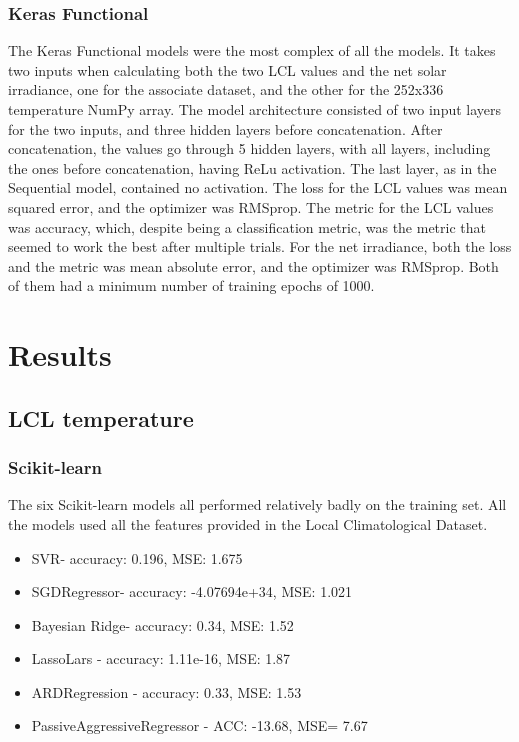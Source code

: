 \documentclass[conference]{IEEEtran}
\begin{document}
\subsubsection{Keras Functional}
The Keras Functional models were the most complex of all the models. It takes two inputs when calculating both the two LCL values and the net solar irradiance, one for the associate dataset, and the other for the 252x336 temperature NumPy array. The model
architecture consisted of two input layers for the two inputs, and three hidden layers before concatenation. After concatenation, the values go through 5 hidden layers, with all layers, including the ones before concatenation, having ReLu activation. The last layer,
as in the Sequential model, contained no activation. The loss for the LCL values was mean squared error, and the optimizer was RMSprop. The metric for the LCL values was accuracy, which, despite being a classification metric, was the metric that seemed to
work the best after multiple trials. For the net irradiance, both the loss and the metric was mean absolute error, and the optimizer was RMSprop. Both of them had a minimum number of training epochs of 1000.
\section{Results}
\subsection{LCL temperature}
\subsubsection{Scikit-learn}
The six Scikit-learn models all performed relatively badly on the training set. All the models used all the features provided in the Local Climatological Dataset.
\begin{itemize}
\item SVR- accuracy: 0.196, MSE: 1.675
\item SGDRegressor- accuracy: -4.07694e+34, MSE: 1.021
\item Bayesian Ridge- accuracy: 0.34, MSE: 1.52
\item LassoLars - accuracy: 1.11e-16, MSE: 1.87
\item ARDRegression - accuracy: 0.33, MSE: 1.53
\item PassiveAggressiveRegressor - ACC: -13.68, MSE= 7.67
\end{itemize}
\end{document}
